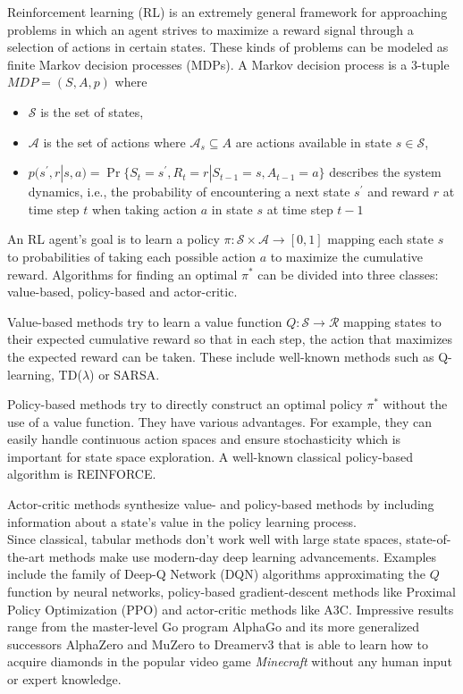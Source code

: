 Reinforcement learning (RL) is an extremely general framework for approaching problems
in which an agent strives to maximize a reward signal through a selection of actions
in certain states.\cite{sutton1998reinforcement}
These kinds of problems can be modeled as finite Markov decision processes (MDPs).
A Markov decision process is a 3-tuple $MDP=(S,A,p)$ where

\begin{itemize}
  \item $\mathcal{S}$ is the set of states,
  \item $\mathcal{A}$ is the set of actions where $\mathcal{A}_s\subseteq A$ are actions available in state $s\in\mathcal{S}$,
  \item $p(s^\prime,r|s,a)=\Pr\{S_t=s^\prime, R_t=r|S_{t-1}=s, A_{t-1}=a\}$
  describes the system dynamics, i.e., the probability of encountering a next
  state $s^\prime$ and reward $r$ at time step $t$ when taking action $a$ in
  state $s$ at time step $t-1$
\end{itemize}

An RL agent's goal is to learn a policy $\pi:\mathcal{S}\times\mathcal{A}\rightarrow [0,1]$
mapping each state $s$ to probabilities of taking each possible action $a$ to maximize
the cumulative reward.
Algorithms for finding an optimal $\pi^*$ can be divided into three classes:
value-based, policy-based and actor-critic.

Value-based methods try to learn a value function $Q:\mathcal{S}\rightarrow \mathcal{R}$
mapping states to their expected cumulative reward so that in each step, the
action that maximizes the expected reward can be taken.
These include well-known methods such as Q-learning, TD($\lambda$) or SARSA.

Policy-based methods try to directly construct an optimal policy $\pi^*$ without the
use of a value function.
They have various advantages.
For example, they can easily handle continuous action spaces and ensure stochasticity
which is important for state space exploration.
A well-known classical policy-based algorithm is REINFORCE.\cite{williams1992simple}

Actor-critic methods synthesize value- and policy-based methods by including information
about a state's value in the policy learning process.\\

Since classical, tabular methods don't work well with large state spaces,
state-of-the-art methods make use modern-day deep learning advancements.
Examples include the family of Deep-Q Network (DQN)
algorithms\cite{mnih2013playing}\cite{hessel2018rainbow} approximating the $Q$
function by neural networks, policy-based gradient-descent methods like
Proximal Policy Optimization (PPO)\cite{schulman2017proximal} and actor-critic
methods like A3C\cite{mnih2016asynchronous}.
Impressive results range from the master-level Go program
AlphaGo\cite{silver2016mastering} and its more generalized successors
AlphaZero\cite{silver2017mastering} and MuZero\cite{schrittwieser2020mastering}
to Dreamerv3\cite{hafner2023mastering} that is able to learn how to acquire
diamonds in the popular video game \textit{Minecraft} without any human input
or expert knowledge.
